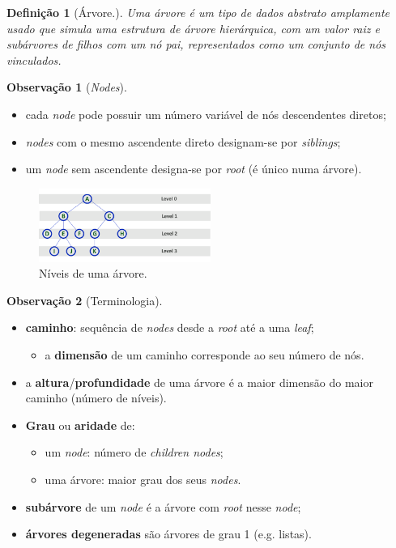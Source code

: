 \documentclass[a4paper, 12pt]{article}
\newtheorem{definition}{Definição}[section]
\newtheorem{remark}{Observação}
\begin{document}
\begin{definition}[Árvore.]
    Uma árvore é um tipo de dados abstrato amplamente usado que simula uma estrutura de árvore hierárquica, com um valor raiz e subárvores de filhos com um nó pai, representados como um conjunto de nós vinculados.
\end{definition}

\begin{remark}[\emph{Nodes}]\end{remark}

    \begin{itemize}
        \item cada \emph{node} pode possuir um número variável de nós descendentes diretos;
        \item \emph{nodes} com o mesmo ascendente direto designam-se por \emph{siblings};
        \item um \emph{node} sem ascendente designa-se por \emph{root} (é único numa árvore).
    \end{itemize}
    \begin{center}
        \begin{figure}[H]
            \centering
            \includegraphics[width=0.5\textwidth]{fig/t/tlevels.png}
            \caption{Níveis de uma árvore.}
        \end{figure}
    \end{center}


\begin{remark}[Terminologia]\end{remark}
    \begin{itemize}
        \item \textbf{caminho}: sequência de \emph{nodes} desde a \emph{root} até a uma \emph{leaf};
        \begin{itemize}
            \item a \textbf{dimensão} de um caminho corresponde ao seu número de nós.
        \end{itemize}
        \item a \textbf{altura}/\textbf{profundidade} de uma árvore é a maior dimensão do maior caminho (número de níveis).
        \item \textbf{Grau} ou \textbf{aridade} de:
        \begin{itemize}
            \item um \emph{node}: número de \emph{children nodes};
            \item uma árvore: maior grau dos seus \emph{nodes}.
        \end{itemize}
        \item \textbf{subárvore} de um \emph{node} é a árvore com \emph{root} nesse \emph{node};
        \item \textbf{árvores degeneradas} são árvores de grau 1 (e.g. listas).
    \end{itemize}
\end{document}
